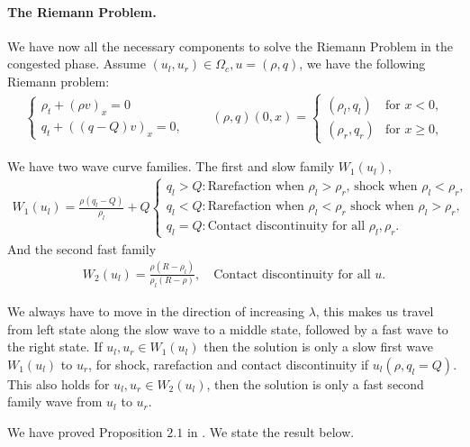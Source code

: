 \documentclass[10pt]{article}
\numberwithin{equation}{section}
\begin{document}
\paragraph{The Riemann Problem.}
We have now all the necessary components to solve the Riemann Problem in the congested phase. Assume $(u_l, u_r) \in \Omega_c, u = (\rho, q)$, we have the following Riemann problem: 
\begin{align}
     \begin{cases} \rho_t + (\rho v)_x = 0 \\
     q_t + ((q-Q)v)_x = 0 ,
    \end{cases} \quad \quad (\rho, q) (0,x) = \begin{cases}
    (\rho_l, q_l) & \text{for $x < 0$,} \\
    (\rho_r, q_r) &  \text{for $x \geq 0$,}
    \end{cases}
    \label{Eq:RPCongestedPhase}
\end{align}

We have two wave curve families. The first and slow family $W_1(u_l)$, 
\begin{align*}
     W_1(u_l) = \frac{\rho( q_l - Q)}{\rho_l} + Q  \begin{cases}
          q_l > Q:  \text{Rarefaction when $\rho_l > \rho_r$, shock when $\rho_l < \rho_r$,}\\
          q_l < Q: \text{Rarefaction when $\rho_l < \rho_r$ shock when $\rho_l > \rho_r$,} \\
          q_l = Q:  \text{Contact discontinuity for all $\rho_l, \rho_r$. } \
     \end{cases}
\end{align*}
And the second fast family 
\begin{align*}
     W_2(u_l) = \frac{\rho( R - \rho_l)}{\rho_l( R - \rho)}, \quad \text{Contact discontinuity for all $u$.}
\end{align*}

We always have to move in the direction of increasing $\lambda$, this makes us travel from left state along the slow wave to a middle state, followed by a fast wave to the right state. If $u_l, u_r \in W_1(u_l)$ then the solution is only a slow first wave $W_1(u_l)$ to $u_r$, for shock, rarefaction and contact discontinuity if $u_l(\rho, q_l = Q)$. This also holds for $u_l, u_r \in W_2(u_l)$, then the solution is only a fast second family wave from $u_l$ to $u_r$. 

We have proved Proposition $2.1$ in \cite{Colombo2002}. We state the result below.
\end{document}
